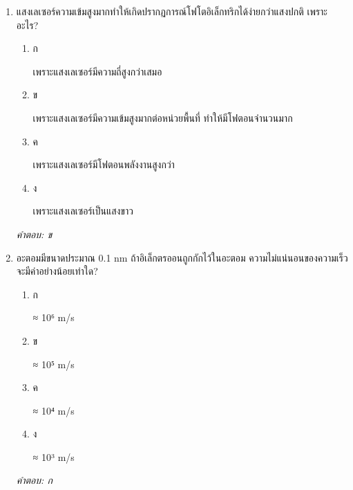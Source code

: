 \documentclass[12pt]{article}
\begin{document}
\begin{enumerate}[label=\arabic*., itemsep=0.5\baselineskip, topsep=0.5\baselineskip, leftmargin=*]
\item แสงเลเซอร์ความเข้มสูงมากทำให้เกิดปรากฏการณ์โฟโตอิเล็กทริกได้ง่ายกว่าแสงปกติ เพราะอะไร?
\begin{enumerate}[label=\alph*)., itemsep=0.3\baselineskip, topsep=0.3\baselineskip]
\item ก\ 
\begin{minipage}[t]{0.9\linewidth}
\raggedright เพราะแสงเลเซอร์มีความถี่สูงกว่าเสมอ
\end{minipage}
\item ข\ 
\begin{minipage}[t]{0.9\linewidth}
\raggedright เพราะแสงเลเซอร์มีความเข้มสูงมากต่อหน่วยพื้นที่ ทำให้มีโฟตอนจำนวนมาก
\end{minipage}
\item ค\ 
\begin{minipage}[t]{0.9\linewidth}
\raggedright เพราะแสงเลเซอร์มีโฟตอนพลังงานสูงกว่า
\end{minipage}
\item ง\ 
\begin{minipage}[t]{0.9\linewidth}
\raggedright เพราะแสงเลเซอร์เป็นแสงขาว
\end{minipage}
\end{enumerate}
\vspace{-0.3\baselineskip}
\begin{small}
\textit{คำตอบ: ข}
\end{small}

\item อะตอมมีขนาดประมาณ 0.1 nm ถ้าอิเล็กตรออนถูกกักไว้ในอะตอม ความไม่แน่นอนของความเร็วจะมีค่าอย่างน้อยเท่าใด?
\begin{enumerate}[label=\alph*)., itemsep=0.3\baselineskip, topsep=0.3\baselineskip]
\item ก\ 
\begin{minipage}[t]{0.9\linewidth}
\raggedright ≈ 10⁶ m/s
\end{minipage}
\item ข\ 
\begin{minipage}[t]{0.9\linewidth}
\raggedright ≈ 10⁵ m/s
\end{minipage}
\item ค\ 
\begin{minipage}[t]{0.9\linewidth}
\raggedright ≈ 10⁴ m/s
\end{minipage}
\item ง\ 
\begin{minipage}[t]{0.9\linewidth}
\raggedright ≈ 10³ m/s
\end{minipage}
\end{enumerate}
\vspace{-0.3\baselineskip}
\begin{small}
\textit{คำตอบ: ก}
\end{small}

\end{enumerate}
\end{document}
